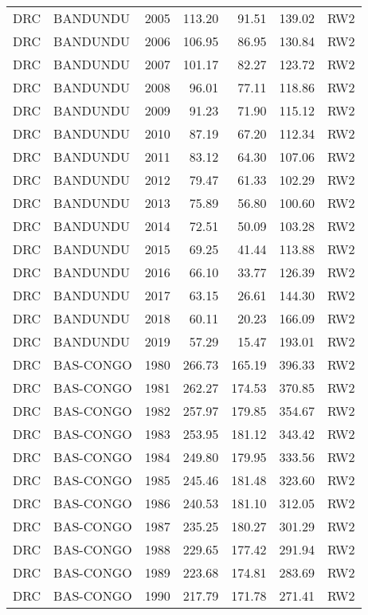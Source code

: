 \begin{longtable}{lllrrrl}
  DRC & BANDUNDU & 2005 & 113.20 & 91.51 & 139.02 & RW2 \\ 
  DRC & BANDUNDU & 2006 & 106.95 & 86.95 & 130.84 & RW2 \\ 
  DRC & BANDUNDU & 2007 & 101.17 & 82.27 & 123.72 & RW2 \\ 
  DRC & BANDUNDU & 2008 & 96.01 & 77.11 & 118.86 & RW2 \\ 
  DRC & BANDUNDU & 2009 & 91.23 & 71.90 & 115.12 & RW2 \\ 
  DRC & BANDUNDU & 2010 & 87.19 & 67.20 & 112.34 & RW2 \\ 
  DRC & BANDUNDU & 2011 & 83.12 & 64.30 & 107.06 & RW2 \\ 
  DRC & BANDUNDU & 2012 & 79.47 & 61.33 & 102.29 & RW2 \\ 
  DRC & BANDUNDU & 2013 & 75.89 & 56.80 & 100.60 & RW2 \\ 
  DRC & BANDUNDU & 2014 & 72.51 & 50.09 & 103.28 & RW2 \\ 
  DRC & BANDUNDU & 2015 & 69.25 & 41.44 & 113.88 & RW2 \\ 
  DRC & BANDUNDU & 2016 & 66.10 & 33.77 & 126.39 & RW2 \\ 
  DRC & BANDUNDU & 2017 & 63.15 & 26.61 & 144.30 & RW2 \\ 
  DRC & BANDUNDU & 2018 & 60.11 & 20.23 & 166.09 & RW2 \\ 
  DRC & BANDUNDU & 2019 & 57.29 & 15.47 & 193.01 & RW2 \\ 
  DRC & BAS-CONGO & 1980 & 266.73 & 165.19 & 396.33 & RW2 \\ 
  DRC & BAS-CONGO & 1981 & 262.27 & 174.53 & 370.85 & RW2 \\ 
  DRC & BAS-CONGO & 1982 & 257.97 & 179.85 & 354.67 & RW2 \\ 
  DRC & BAS-CONGO & 1983 & 253.95 & 181.12 & 343.42 & RW2 \\ 
  DRC & BAS-CONGO & 1984 & 249.80 & 179.95 & 333.56 & RW2 \\ 
  DRC & BAS-CONGO & 1985 & 245.46 & 181.48 & 323.60 & RW2 \\ 
  DRC & BAS-CONGO & 1986 & 240.53 & 181.10 & 312.05 & RW2 \\ 
  DRC & BAS-CONGO & 1987 & 235.25 & 180.27 & 301.29 & RW2 \\ 
  DRC & BAS-CONGO & 1988 & 229.65 & 177.42 & 291.94 & RW2 \\ 
  DRC & BAS-CONGO & 1989 & 223.68 & 174.81 & 283.69 & RW2 \\ 
  DRC & BAS-CONGO & 1990 & 217.79 & 171.78 & 271.41 & RW2 \\ 

\end{longtable}
